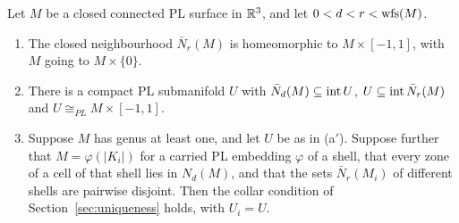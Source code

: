 \begin{lemma}[Collar]\label{lem:collar}
Let $M$ be a closed connected PL surface in $\mathbb{R}^3$, and let $0<d<r<\operatorname{wfs}(M)$.
\begin{enumerate}
\item[(a)] The closed neighbourhood $\bar N_r(M)$ is homeomorphic to $M\times[-1,1]$, with $M$ going to
$M\times\{0\}$.
\item[(a$'$)] There is a compact PL submanifold $U$ with $\bar N_d(M)\subseteq\operatorname{int} U$, $U\subseteq\operatorname{int}\bar
N_r(M)$ and $U\cong_{PL}M\times[-1,1]$.
\item[(b)] Suppose $M$ has genus at least one, and let $U$ be as in (a$'$). Suppose further that $M=\varphi(|K_i|)$ for a carried PL embedding $\varphi$ of a
shell, that every zone of a cell of that shell lies in $N_d(M)$, and that the sets $\bar N_r(M_i)$ of different shells
are pairwise disjoint. Then the collar condition of Section~\ref{sec:uniqueness} holds, with $U_i=U$.
\end{enumerate}
\end{lemma}
